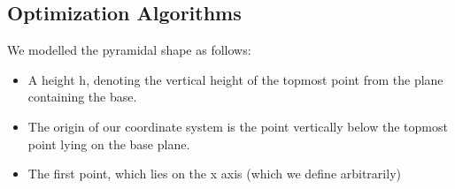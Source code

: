 \subsection{Optimization Algorithms}
We modelled the pyramidal shape as follows:\\
\begin{itemize}
    \item A height h, denoting the vertical height of the topmost point from the plane containing the base.\\
    \item The origin of our coordinate system is the point vertically below the topmost point lying on the base plane.\\
    \item The first point, which lies on the x axis (which we define arbitrarily)
\end{itemize}
